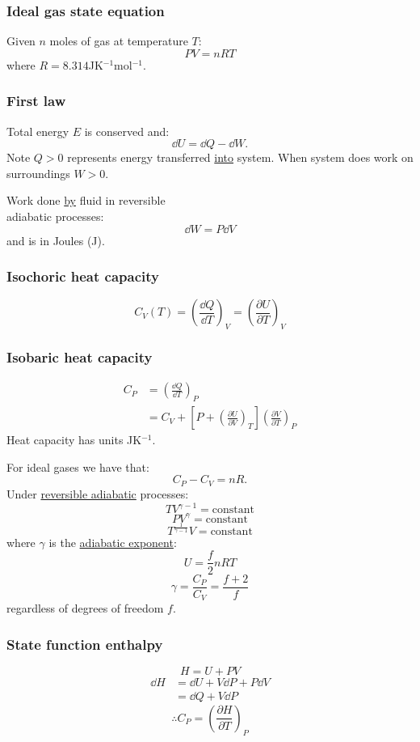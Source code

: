 \documentclass{article}
\begin{document}
\begin{multicols*}{3}
\subsubsection*{Ideal gas state equation}
Given $n$ moles of gas at temperature $T$:
$$PV=nRT$$
where $R=8.314$JK$^{-1}$mol$^{-1}$.

\subsubsection*{First law}
Total energy $E$ is conserved and:
$$\dd U=\dd Q-\dd W.$$
Note $Q>0$ represents energy transferred
\underline{into} system.
When system does work on surroundings $W>0$.

Work done \underline{by} fluid
in reversible \\
adiabatic processes:
$$\dd W=P\dd V$$
and is in Joules (J).

\subsubsection*{Isochoric heat capacity}
$$C_V(T)=\left(\frac{\dd Q}{\dd T}\right)_V
=\left(\frac{\partial U}{\partial T}\right)_V$$

\subsubsection*{Isobaric heat capacity}
\begin{align*}
    C_P
    &=\left(\frac{\dd Q}{\dd T}\right)_P \\
    &=C_V+\left[P+
    \left(\frac{\partial U}{\partial V}\right)_T\right]
    \left(\frac{\partial V}{\partial T}\right)_P
\end{align*}
Heat capacity has units JK$^{-1}$.

For ideal gases we have that:
$$C_P-C_V=nR.$$
Under \underline{reversible adiabatic} processes:
$$TV^{\gamma-1}=\text{constant}$$
$$PV^{\gamma}=\text{constant}$$
$$T^{\frac{1}{\gamma-1}}V=\text{constant}$$
where $\gamma$ is the \underline{adiabatic exponent}:
$$U=\frac{f}{2}nRT$$
$$\gamma=\frac{C_P}{C_V}
=\frac{f+2}{f}$$
regardless of degrees of freedom $f$.

\subsubsection*{State function enthalpy}
$$H=U+PV$$
\begin{align*}
    \dd H
    &=\dd U+V\dd P+P\dd V \\
    &=\dd Q+V\dd P
\end{align*}
$$\therefore C_P
=\left(\frac{\partial H}{\partial T}\right)_P$$


\end{multicols*}
\end{document}
